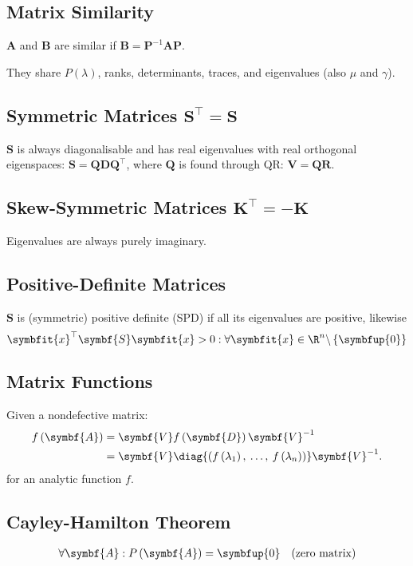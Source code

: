 \documentclass{article}
\begin{document}
\begin{multicols*}{3}
    \subsection{Matrix Similarity}
    \(\symbf{A}\) and \(\symbf{B}\) are similar if \(\symbf{B} = \symbf{P}^{-1} \symbf{A} \symbf{P}\).

    They share \(P(\lambda)\), ranks, determinants, traces, and eigenvalues (also \(\mu\) and \(\gamma\)).
    \subsection{Symmetric Matrices \texorpdfstring{\(\symbf{S}^\top = \symbf{S}\)}{S' = S}}
    \(\symbf{S}\) is always diagonalisable and has
    real eigenvalues with real orthogonal eigenspaces: \(\symbf{S} = \symbf{Q} \symbf{D} \symbf{Q}^\top\), where \(\symbf{Q}\) is found through QR\@: \(\symbf{V} = \symbf{Q} \symbf{R}\).
    \subsection{Skew-Symmetric Matrices \texorpdfstring{\(\symbf{K}^\top = -\symbf{K}\)}{K' = -K}}
    Eigenvalues are always purely imaginary.
    \subsection{Positive-Definite Matrices}
    \(\symbf{S}\) is (symmetric) positive definite (SPD) if all its eigenvalues are positive, likewise
    \begin{equation*}
        \symbfit{x}^\top \symbf{S} \symbfit{x} > 0 : \forall \symbfit{x} \in \R^n \backslash \left\{ \symbfup{0} \right\}
    \end{equation*}
    \subsection{Matrix Functions}
    Given a nondefective matrix:
    \begin{align*}
        f\left( \symbf{A} \right) & = \symbf{V} f\left( \symbf{D} \right) \symbf{V}^{-1}                                                               \\
                                  & = \symbf{V} \diag{\left( f\left( \lambda_1 \right),\: \ldots,\: f\left( \lambda_n \right) \right)} \symbf{V}^{-1}.
    \end{align*}
    for an analytic function \(f\).
    \subsection{Cayley-Hamilton Theorem}
    \begin{align*}
        \forall \symbf{A} : P\left( \symbf{A} \right) = \symbfup{0} &  & \text{(zero matrix)}
    \end{align*}

\end{multicols*}
\end{document}
